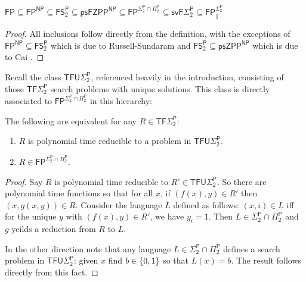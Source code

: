 \begin{lemma}\label{lem:inclusions}
$\mathsf{FP} \subseteq \mathsf{FP^{NP}} \subseteq \mathsf{FS_2^P} \subseteq \mathsf{psFZPP^{NP}} \subseteq \mathsf{FP^{\Sigma_2^P \cap \Pi_2^P}} \subseteq \mathsf{svF\Sigma_2^P} \subseteq \mathsf{FP_{||}^{\Sigma_2^P}}$
\end{lemma}
\begin{proof}
All inclusions follow directly from the definition, with the exceptions of $\mathsf{FP^{NP}} \subseteq \mathsf{FS_2^P}$ which is due to Russell-Sundaram \cite{russell-sundaram} and $\mathsf{FS_2^P} \subseteq \mathsf{psZPP^{NP}}$ which is due to Cai \cite{cai}.
\end{proof}

Recall the class $\mathsf{TFU\Sigma_2^P}$, referenced heavily in the introduction, consisting of those $\mathsf{TF\Sigma_2^P}$ search problems with unique solutions. This class is directly associated to $\mathsf{FP^{\Sigma_2^P \cap \Pi_2^P}} $ in this hierarchy:
\begin{lemma}\label{lem:unique-intersect}
The following are equivalent for any $R \in \mathsf{TF\Sigma_2^P}$:
\begin{enumerate}
    \item $R$ is polynomial time reducible to a problem in $\mathsf{TFU\Sigma_2^P}$.
    \item $R \in \mathsf{FP^{\Sigma_2^P \cap \Pi_2^P}}$.
\end{enumerate}
\end{lemma}
\begin{proof}
Say $R$ is polynomial time reducible to $R' \in \mathsf{TFU\Sigma_2^P}$. So there are polynomial time functions so that for all $x$, if $(f(x),y)\in R'$ then $(x,g(x,y))\in R$. Consider the language $L$ defined as follows: $(x,i) \in L$ iff for the unique $y$ with $(f(x),y)\in R'$, we have $y_i=1$. Then $L \in \mathsf{\Sigma_2^P \cap \Pi_2^P}$ and $g$ yeilds a reduction from $R$ to $L$.

In the other direction note that any language $L \in \mathsf{\Sigma_2^P \cap \Pi_2^P}$ defines a search problem in $\mathsf{TFU\Sigma_2^P}$: given $x$ find $b \in \{0,1\}$ so that $L(x)=b$. The result follows directly from this fact. 
\end{proof}

